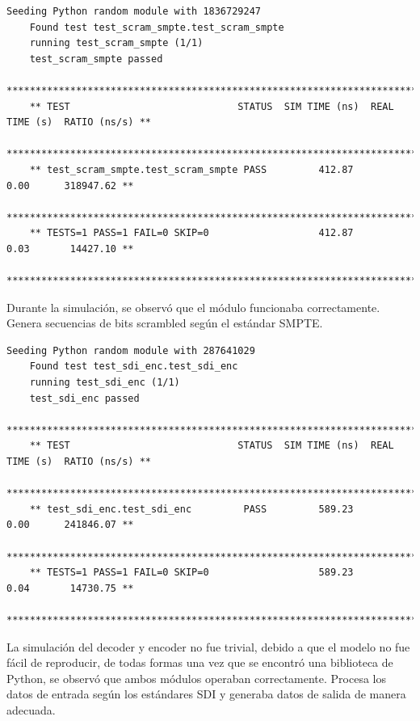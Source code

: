   {\tiny\begin{lstlisting}[caption= "Resultados \textit{test} de \textit{scrambler}.]
    Seeding Python random module with 1836729247
    Found test test_scram_smpte.test_scram_smpte
    running test_scram_smpte (1/1)
    test_scram_smpte passed
    *****************************************************************************************
    ** TEST                             STATUS  SIM TIME (ns)  REAL TIME (s)  RATIO (ns/s) **
    *****************************************************************************************
    ** test_scram_smpte.test_scram_smpte PASS         412.87           0.00      318947.62 **
    *****************************************************************************************
    ** TESTS=1 PASS=1 FAIL=0 SKIP=0                   412.87           0.03       14427.10 **
    *****************************************************************************************
  \end{lstlisting}}

  Durante la simulación, se observó que el módulo funcionaba correctamente.
  Genera secuencias de bits scrambled según el estándar SMPTE\@.

  {\tiny\begin{lstlisting}[caption= "Resultados \textit{test} de \textit{encoder}.]
    Seeding Python random module with 287641029
    Found test test_sdi_enc.test_sdi_enc
    running test_sdi_enc (1/1)
    test_sdi_enc passed
    *****************************************************************************************
    ** TEST                             STATUS  SIM TIME (ns)  REAL TIME (s)  RATIO (ns/s) **
    *****************************************************************************************
    ** test_sdi_enc.test_sdi_enc         PASS         589.23           0.00      241846.07 **
    *****************************************************************************************
    ** TESTS=1 PASS=1 FAIL=0 SKIP=0                   589.23           0.04       14730.75 **
    *****************************************************************************************
  \end{lstlisting}}

  La simulación del decoder y encoder no fue trivial, debido a que el modelo
  no fue fácil de reproducir, de todas formas una vez que se encontró una
  biblioteca de Python, se observó que ambos módulos operaban correctamente.
  Procesa los datos de entrada según los estándares SDI y generaba datos
  de salida de manera adecuada.

